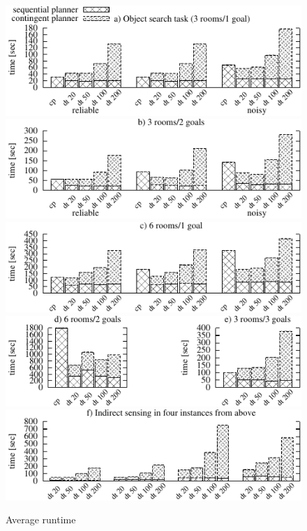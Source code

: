 \documentclass{article}
\begin{document}
\begin{figure}[h!]
  \includegraphics{dora2-time}\hfill
  \includegraphics{dora3-time}\hfill
  \includegraphics{dora4-time}\hfill
  \vspace{2mm}
  \includegraphics{dora56-time}\hfill
  \vspace{2mm}
  \includegraphics{dora-cat-time}\hfill
  \caption{Average runtime}
  \label{fig:results-time}
\end{figure}
\end{document}
